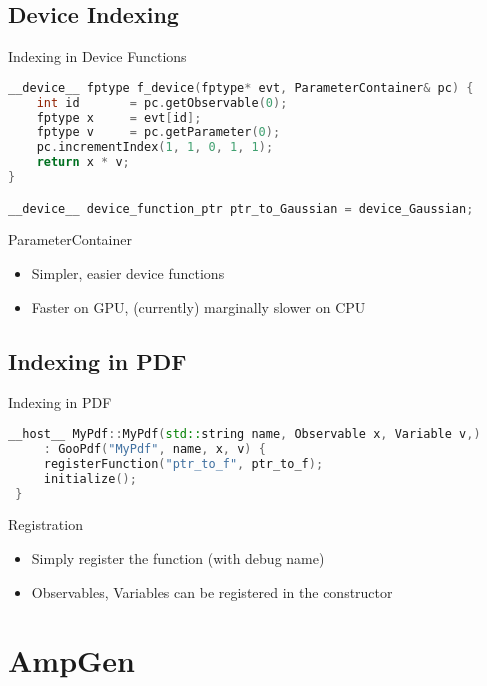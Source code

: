 \documentclass[aspectratio=169, smaller]{beamer}
\begin{document}
\subsection{Device Indexing}
\begin{frame}[fragile]{Indexing in Device Functions}
\begin{lstlisting}[language=C++]
__device__ fptype f_device(fptype* evt, ParameterContainer& pc) {
    int id       = pc.getObservable(0);
    fptype x     = evt[id];
    fptype v     = pc.getParameter(0);
    pc.incrementIndex(1, 1, 0, 1, 1);
    return x * v;
}

__device__ device_function_ptr ptr_to_Gaussian = device_Gaussian;
\end{lstlisting}

\begin{block}{ParameterContainer}
    \begin{itemize}
        \item Simpler, easier device functions
        \item Faster on GPU, (currently) marginally slower on CPU
    \end{itemize}
\end{block}
\end{frame}

\subsection{Indexing in PDF}
\begin{frame}[fragile]{Indexing in PDF}
\begin{lstlisting}[language=C++]
 __host__ MyPdf::MyPdf(std::string name, Observable x, Variable v,)
     : GooPdf("MyPdf", name, x, v) {
     registerFunction("ptr_to_f", ptr_to_f);
     initialize();
 }
\end{lstlisting}

\begin{block}{Registration}
    \begin{itemize}
        \item Simply register the function (with debug name)
        \item Observables, Variables can be registered in the constructor
    \end{itemize}
\end{block}
\end{frame}

\section{AmpGen}
\end{document}
